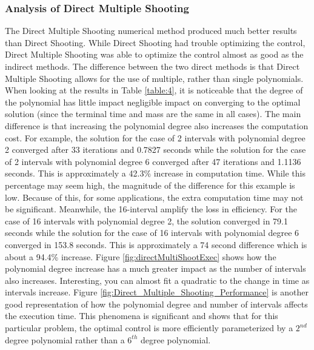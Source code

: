 \documentclass[]{article}
\begin{document}
\subsubsection{Analysis of Direct Multiple Shooting}
The Direct Multiple Shooting numerical method produced much better results than Direct Shooting. While Direct Shooting had trouble optimizing the control, Direct Multiple Shooting was able to optimize the control almost as good as the indirect methods. The difference between the two direct methods is that Direct Multiple Shooting allows for the use of multiple, rather than single polynomials. When looking at the results in Table \ref{table:4}, it is noticeable that the degree of the polynomial has little impact negligible impact on converging to the optimal solution (since the terminal time and mass are the same in all cases). The main difference is that increasing the polynomial degree also increases the computation cost. For example, the solution for the case of 2 intervals with polynomial degree 2 converged after 33 iterations and 0.7827 seconds while the solution for the case of 2 intervals with polynomial degree 6 converged after 47 iterations and 1.1136 seconds. This is approximately a 42.3\% increase in computation time. While this percentage may seem high, the magnitude of the difference for this example is low. Because of this, for some applications, the extra computation time may not be significant. Meanwhile, the 16-interval amplify the loss in efficiency. For the case of 16 intervals with polynomial degree 2, the solution converged in 79.1 seconds while the solution for the case of 16 intervals with polynomial degree 6 converged in 153.8 seconds. This is approximately a 74 second difference which is about a 94.4\% increase. Figure \ref{fig:directMultiShootExec} shows how the polynomial degree increase has a much greater impact as the number of intervals also increases. Interesting, you can almost fit a quadratic to the change in time as intervals increase. Figure \ref{fig:Direct_Multiple_Shooting_Performance} is another good representation of how the polynomial degree and number of intervals affects the execution time. This phenomena is significant and shows that for this particular problem, the optimal control is more efficiently parameterized by a \(2^{nd}\) degree polynomial rather than a \(6^{th}\) degree polynomial.
\end{document}

